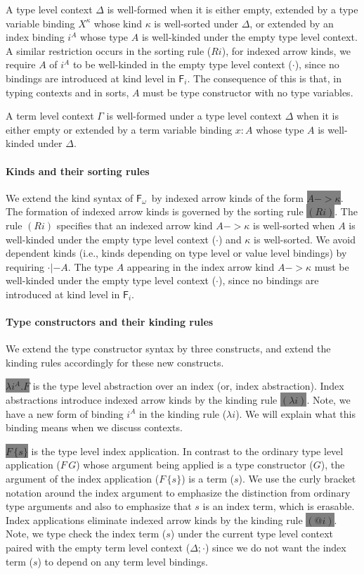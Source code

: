 \documentclass[preprint]{sigplanconf}
\newcommand{\newFi}[1]{\colorbox{grey}{\ensuremath{#1}}}
\newcommand{\ie}{{i.e.}}
\newcommand{\Fi}{\ensuremath{\mathsf{F}_i}}
\newcommand{\Fw}{\ensuremath{\mathsf{F}_\omega}}
\theoremstyle{plain}
\theoremstyle{remark}
\theoremstyle{definition}
\begin{document}
A type level context $\Delta$ is well-formed when it is either empty,
extended by a type variable binding $X^\kappa$ whose kind $\kappa$ is
well-sorted under $\Delta$, or extended by an index binding $i^A$
whose type $A$ is well-kinded under the empty type level context.
A similar restriction occurs in the sorting rule ($Ri$), for indexed arrow kinds,
we require $A$ of $i^A$ to be well-kinded in the empty type level context
($\cdot$), since no bindings are introduced at kind level in \Fi. The consequence of
this is that, in typing contexts and in sorts, $A$ must be type constructor with no
type variables.

A term level context $\Gamma$ is well-formed under a type level context
$\Delta$ when it is either empty or extended by a term variable binding
$x:A$ whose type $A$ is well-kinded under $\Delta$.


\paragraph{Kinds and their sorting rules}
We extend the kind syntax of \Fw\ by indexed arrow kinds of the form
\newFi{A -> \kappa}. The formation of indexed arrow kinds is
governed by the sorting rule \newFi{(Ri)}. The rule $(Ri)$ specifies that
an indexed arrow kind $A -> \kappa$ is well-sorted when $A$ is well-kinded
under the empty type level context ($\cdot$) and $\kappa$ is well-sorted.
We avoid dependent kinds (\ie, kinds depending on type level or value level
bindings) by requiring $\cdot |- A$. The type $A$ appearing in
the index arrow kind $A -> \kappa$ must be well-kinded under
the empty type level context ($\cdot$), since no bindings are
introduced at kind level in \Fi.

\paragraph{Type constructors and their kinding rules}
We extend the type constructor syntax by three constructs,
and extend the kinding rules accordingly for these new constructs.

\newFi{\lambda i^A.F} is the type level abstraction over an index
(or, index abstraction). Index abstractions introduce indexed arrow kinds
by the kinding rule \newFi{(\lambda i)}. Note, we have a new form of binding
$i^A$ in the kinding rule ($\lambda i$).
We will explain what this binding means when we discuss contexts.

\newFi{F\,\{s\}} is the type level index application. In contrast to
the ordinary type level application ($F\,G$) whose argument being applied is
a type constructor ($G$), the argument of the index application ($F\,\{s\}$) is
a term ($s$). We use the curly bracket notation around the index argument to
emphasize the distinction from ordinary type arguments and also to emphasize
that $s$ is an index term, which is erasable. Index applications eliminate
indexed arrow kinds by the kinding rule \newFi{(@i)}. Note, we type check
the index term ($s$) under the current type level context paired with
the empty term level context ($\Delta;\cdot$) since we do not want
the index term ($s$) to depend on any term level bindings.
\end{document}
